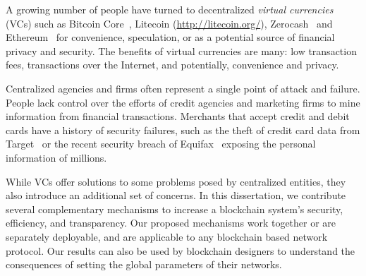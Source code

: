 A growing number of people have turned to decentralized {\em virtual
currencies} (VCs) such as Bitcoin Core~\cite{Nakamoto:2009},
Litecoin (\url{http://litecoin.org/}), Zerocash~\cite{sasson:2014} and Ethereum~\cite{ETHASH} for convenience, speculation, 
or as a potential source of financial privacy and security. The benefits of virtual currencies are many: low transaction
fees, transactions over the Internet, and potentially, convenience and
privacy. 

Centralized agencies and firms often represent a single point of attack and
 failure. People lack control over the
efforts of credit agencies and marketing firms to mine information
from financial transactions. Merchants that accept
credit and debit cards have a history of security  
failures, such as the theft of credit card data from Target~\cite{harris:2014,perlroth:2013} or the recent security breach of Equifax~\cite{equifax} exposing the personal information of millions. 

While VCs offer solutions to some problems posed by centralized entities, they also introduce an additional set of concerns. In this dissertation, we contribute several complementary mechanisms to increase a blockchain system's security, efficiency, and transparency. Our proposed mechanisms work together or are separately deployable, and are applicable to any blockchain based network protocol. Our results can also be used by blockchain designers to understand the consequences of setting the global parameters of their networks. 

